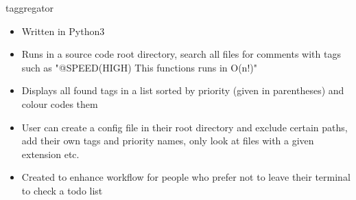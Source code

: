 \item taggregator
\begin{itemize}
    \item Written in Python3
    \item Runs in a source code root directory, search all files for comments with tags such as "@SPEED(HIGH) This functions runs in O(n!)"
    \item Displays all found tags in a list sorted by priority (given in parentheses) and colour codes them
    \item User can create a config file in their root directory and exclude certain paths, add their own tags and priority names, only look at files with a given extension etc.
    \item Created to enhance workflow for people who prefer not to leave their terminal to check a todo list
\end{itemize}
